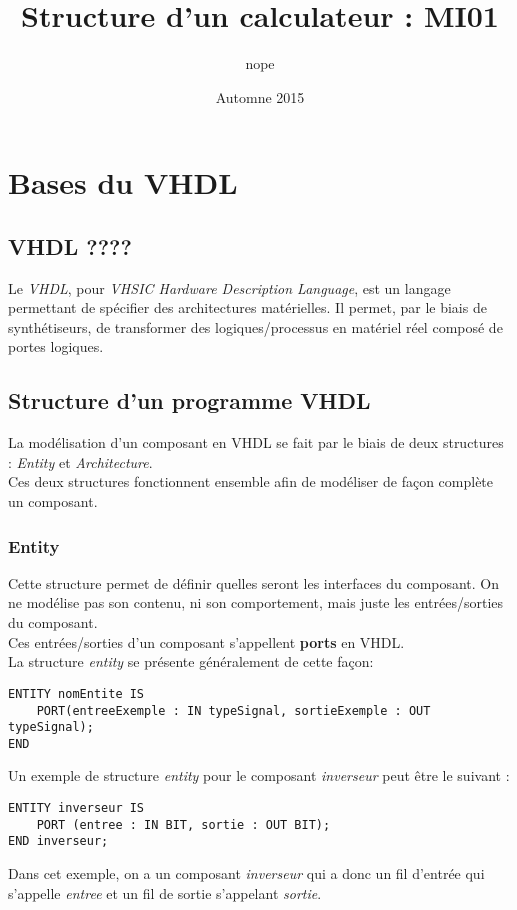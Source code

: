 \documentclass[11.5pt]{report}
\title{Structure d'un calculateur : \textbf{MI01}}
\author{nope}
\date{Automne 2015}
\begin{document}
\maketitle{}

\tableofcontents

\chapter{Bases du VHDL}
\section{VHDL ????}
Le \emph{VHDL}, pour \emph{VHSIC Hardware Description Language}, est un langage permettant de spécifier des architectures matérielles.
Il permet, par le biais de synthétiseurs, de transformer des logiques/processus en matériel réel composé de portes logiques.

\section{Structure d'un programme VHDL}
La modélisation d'un composant en VHDL se fait par le biais de deux structures : \emph{Entity} et \emph{Architecture}.\\
Ces deux structures fonctionnent ensemble afin de modéliser de façon complète un composant.
\subsection{Entity}\label{entites}
Cette structure permet de définir quelles seront les interfaces du composant.
On ne modélise pas son contenu, ni son comportement, mais juste les entrées/sorties du composant.\\
Ces entrées/sorties d'un composant s'appellent \textbf{ports} en VHDL.\\
La structure \emph{entity} se présente généralement de cette façon:
\begin{verbatim}
ENTITY nomEntite IS
	PORT(entreeExemple : IN typeSignal, sortieExemple : OUT typeSignal);
END
\end{verbatim}
Un exemple de structure \emph{entity} pour le composant \emph{inverseur} peut être le suivant :
\begin{verbatim}
ENTITY inverseur IS
	PORT (entree : IN BIT, sortie : OUT BIT);
END inverseur;
\end{verbatim}
Dans cet exemple, on a un composant \emph{inverseur} qui a donc un fil d'entrée qui s'appelle \emph{entree} et un fil de sortie s'appelant \emph{sortie}.
\end{document}
